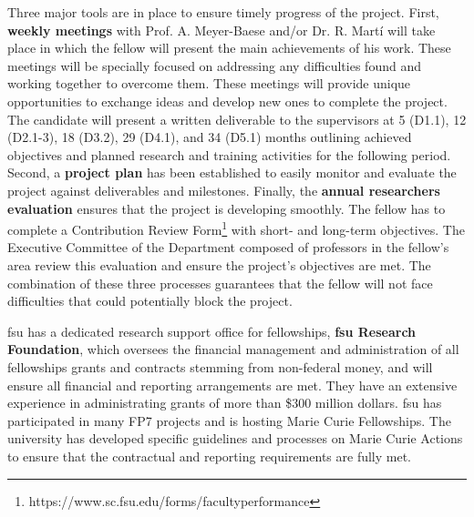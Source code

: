 Three major tools are in place to ensure timely progress of the project.
First, \textbf{weekly meetings} with Prof. A. Meyer-Baese and/or Dr. R. Mart\'i will take place in which the fellow will present the main achievements of his work.
These meetings will be specially focused on addressing any difficulties found and working together to overcome them.
These meetings will provide unique opportunities to exchange ideas and develop new ones to complete the project.
The candidate will present a written deliverable to the supervisors at 5 (D1.1), 12 (D2.1-3), 18 (D3.2), 29 (D4.1), and 34 (D5.1) months outlining achieved objectives and planned research and training activities for the following period.
Second, a \textbf{project plan} has been established to easily monitor and evaluate the project against deliverables and milestones.
Finally, the \textbf{annual researchers evaluation} ensures that the project is developing smoothly.
The fellow has to complete a Contribution Review Form\footnote{https://www.sc.fsu.edu/forms/facultyperformance} with short- and long-term objectives.
The Executive Committee of the Department composed of professors in the fellow's area review this evaluation and ensure the project's objectives are met.
The combination of these three processes guarantees that the fellow will not face difficulties that could potentially block the project.

\ac{fsu} has a dedicated research support office for fellowships, \textbf{\ac{fsu} Research Foundation}, which oversees the financial management and administration of all fellowships grants and contracts stemming from non-federal money, and will ensure all financial and reporting arrangements are met.
They have an extensive experience in administrating grants of more than \$300 million dollars.
\ac{fsu} has participated in many FP7 projects and is hosting Marie Curie Fellowships.
The university has developed specific guidelines and processes on Marie Curie Actions to ensure that the contractual and reporting requirements are fully met.


